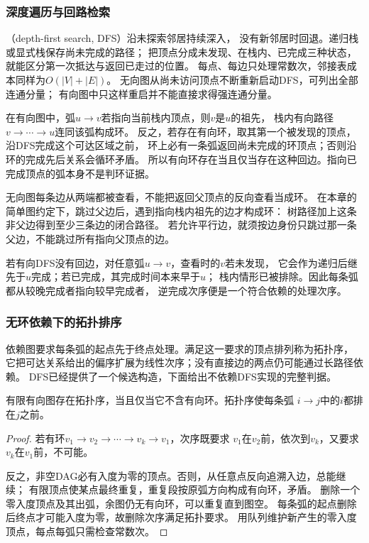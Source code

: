 \subsubsection{深度遍历与回路检索}
\label{sec:graph-theory-dfs}

（depth-first search, DFS）沿未探索邻居持续深入，
没有新邻居时回退。递归栈或显式栈保存尚未完成的路径；
把顶点分成未发现、在栈内、已完成三种状态，就能区分第一次抵达与返回已走过的位置。
每点、每边只处理常数次，邻接表成本同样为\(O(|V|+|E|)\)。
无向图从尚未访问顶点不断重新启动DFS，可列出全部连通分量；
有向图中只这样重启并不能直接求得强连通分量。

在有向图中，弧\(u\to v\)若指向当前栈内顶点，则\(v\)是\(u\)的祖先，
栈内有向路径\(v\to\cdots\to u\)连同该弧构成环。
反之，若存在有向环，取其第一个被发现的顶点，沿DFS完成这个可达区域之前，
环上必有一条弧返回尚未完成的环顶点；否则沿环的完成先后关系会循环矛盾。
所以有向环存在当且仅当存在这种回边。指向已完成顶点的弧本身不是判环证据。

无向图每条边从两端都被查看，不能把返回父顶点的反向查看当成环。
在本章的简单图约定下，跳过父边后，遇到指向栈内祖先的边才构成环：
树路径加上这条非父边得到至少三条边的闭合路径。
若允许平行边，就须按边身份只跳过那一条父边，不能跳过所有指向父顶点的边。

若有向DFS没有回边，对任意弧\(u\to v\)，查看时的\(v\)若未发现，
它会作为递归后继先于\(u\)完成；若已完成，其完成时间本来早于\(u\)；
栈内情形已被排除。因此每条弧都从较晚完成者指向较早完成者，
逆完成次序便是一个符合依赖的处理次序。

\subsubsection{无环依赖下的拓扑排序}
\label{sec:graph-theory-topological-order}

依赖图要求每条弧的起点先于终点处理。满足这一要求的顶点排列称为拓扑序，
它把可达关系给出的偏序扩展为线性次序；没有直接边的两点仍可能通过长路径依赖。
DFS已经提供了一个候选构造，下面给出不依赖DFS实现的完整判据。

\begin{theorem}[DAG的拓扑排序]
  \label{thm:graph-theory-topological-order}
  有限有向图存在拓扑序，当且仅当它不含有向环。拓扑序使每条弧
  \(i\to j\)中的\(i\)都排在\(j\)之前。
\end{theorem}

\begin{proof}
若有环\(v_1\to v_2\to\cdots\to v_k\to v_1\)，次序既要求
\(v_1\)在\(v_2\)前，依次到\(v_k\)，又要求\(v_k\)在\(v_1\)前，不可能。

反之，非空DAG必有入度为零的顶点。否则，从任意点反向追溯入边，总能继续；
有限顶点使某点最终重复，重复段按原弧方向构成有向环，矛盾。
删除一个零入度顶点及其出弧，余图仍无有向环，可以重复直到图空。
每条弧的起点删除后终点才可能入度为零，故删除次序满足拓扑要求。
用队列维护新产生的零入度顶点，每点每弧只需检查常数次。
\end{proof}


